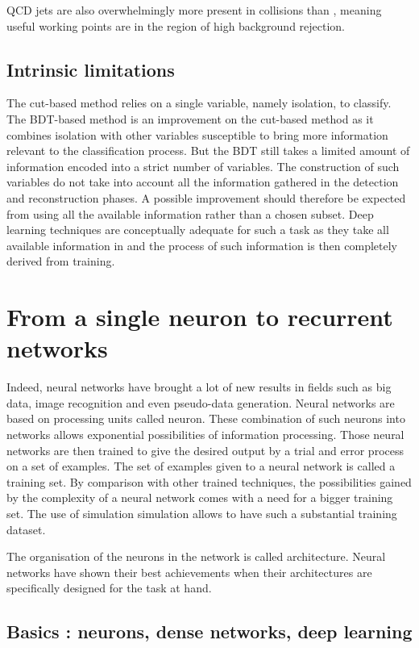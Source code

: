 QCD jets are also overwhelmingly more present in collisions than \tauh, meaning useful working points are in the region of high background rejection. 

\subsection{Intrinsic limitations}

The cut-based method relies on a single variable, namely isolation, to classify. The BDT-based method is an improvement on the cut-based method as it combines isolation with other variables susceptible to bring more information relevant to the classification process. But the BDT still takes a limited amount of information encoded into a strict number of variables. The construction of such variables do not take into account all the information gathered in the detection and reconstruction phases. A possible improvement should therefore be expected from using all the available information rather than a chosen subset. Deep learning techniques are conceptually adequate for such a task as they take all available information in and the process of such information is then completely derived from training.


\section{From a single neuron to recurrent networks}
\label{sec:NN}
Indeed, neural networks have brought a lot of new results in fields such as big data, image recognition and even pseudo-data generation.
Neural networks are based on processing units called neuron. These combination of such neurons into networks allows exponential possibilities of information processing. Those neural networks are then trained to give the desired output by a trial and error process on a set of examples. The set of examples given to a neural network is called a training set. By comparison with other trained techniques, the possibilities gained by the complexity of a neural network comes with a need for a bigger training set. The use of simulation simulation allows to have such a substantial training dataset.

The organisation of the neurons in the network is called architecture. Neural networks have shown their best achievements when their architectures are specifically designed for the task at hand.

\subsection{Basics : neurons, dense networks, deep learning}

